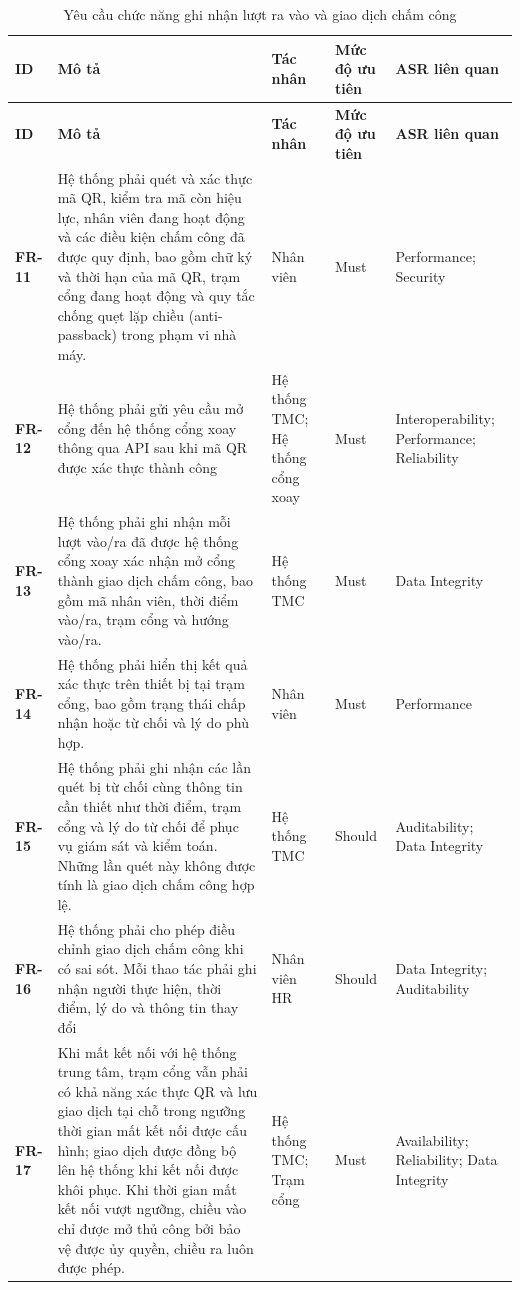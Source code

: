 \begingroup
\small
\renewcommand{\arraystretch}{1.2}
\begin{longtable}{|>{\centering\arraybackslash}m{1.3cm}|>{\raggedright\arraybackslash}m{6.2cm}|>{\raggedright\arraybackslash}m{2.4cm}|>{\centering\arraybackslash}m{1.5cm}|>{\raggedright\arraybackslash}m{3.5cm}|}
    \caption{Yêu cầu chức năng ghi nhận lượt ra vào và giao dịch chấm công}\label{tab:functional-requirements-attendance}\\
    \hline
    \textbf{ID} & \textbf{Mô tả} & \textbf{Tác nhân} & \textbf{Mức độ ưu tiên} & \textbf{ASR liên quan}\\
    \hline
    \endfirsthead
    \hline
    \textbf{ID} & \textbf{Mô tả} & \textbf{Tác nhân} & \textbf{Mức độ ưu tiên} & \textbf{ASR liên quan}\\
    \hline
    \endhead
    \hline
    \endfoot
    \hline
    \endlastfoot
    \textbf{FR-11} & Hệ thống phải quét và xác thực mã QR, kiểm tra mã còn hiệu lực, nhân viên đang hoạt động và các điều kiện chấm công đã được quy định, bao gồm chữ ký và thời hạn của mã QR, trạm cổng đang hoạt động và quy tắc chống quẹt lặp chiều (anti-passback) trong phạm vi nhà máy. & Nhân viên & Must & Performance; Security\\
    \hline
    \textbf{FR-12} & Hệ thống phải gửi yêu cầu mở cổng đến hệ thống cổng xoay thông qua API sau khi mã QR được xác thực thành công & Hệ thống TMC; Hệ thống cổng xoay & Must & Interoperability; Performance; Reliability\\
    \hline
    \textbf{FR-13} & Hệ thống phải ghi nhận mỗi lượt vào/ra đã được hệ thống cổng xoay xác nhận mở cổng thành giao dịch chấm công, bao gồm mã nhân viên, thời điểm vào/ra, trạm cổng và hướng vào/ra. & Hệ thống TMC & Must & Data Integrity\\
    \hline
    \textbf{FR-14} & Hệ thống phải hiển thị kết quả xác thực trên thiết bị tại trạm cổng, bao gồm trạng thái chấp nhận hoặc từ chối và lý do phù hợp. & Nhân viên & Must & Performance\\
    \hline
    \textbf{FR-15} & Hệ thống phải ghi nhận các lần quét bị từ chối cùng thông tin cần thiết như thời điểm, trạm cổng và lý do từ chối để phục vụ giám sát và kiểm toán. Những lần quét này không được tính là giao dịch chấm công hợp lệ. & Hệ thống TMC & Should & Auditability; Data Integrity\\
    \hline
    \textbf{FR-16} & Hệ thống phải cho phép điều chỉnh giao dịch chấm công khi có sai sót. Mỗi thao tác phải ghi nhận người thực hiện, thời điểm, lý do và thông tin thay đổi & Nhân viên HR & Should & Data Integrity; Auditability\\
    \hline
    \textbf{FR-17} & Khi mất kết nối với hệ thống trung tâm, trạm cổng vẫn phải có khả năng xác thực QR và lưu giao dịch tại chỗ trong ngưỡng thời gian mất kết nối được cấu hình; giao dịch được đồng bộ lên hệ thống khi kết nối được khôi phục. Khi thời gian mất kết nối vượt ngưỡng, chiều vào chỉ được mở thủ công bởi bảo vệ được ủy quyền, chiều ra luôn được phép. & Hệ thống TMC; Trạm cổng & Must & Availability; Reliability; Data Integrity\\
    \hline
\end{longtable}
\endgroup

